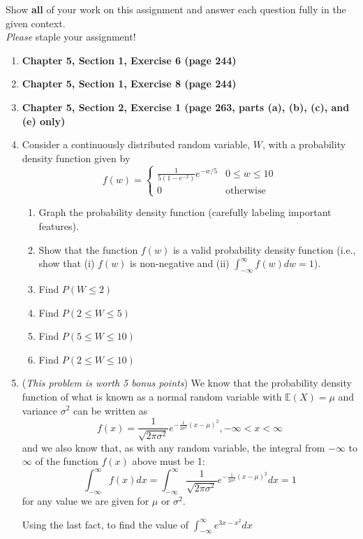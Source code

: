 \documentclass[11pt]{article}
\newcommand{\ben}{\begin{enumerate}}
\newcommand{\een}{\end{enumerate}}
\begin{document}
\pagestyle{fancy} 

Show \textbf{all} of your work on this assignment and answer each question fully in the given context. \\

\emph{Please} staple your assignment! \\

\ben

\item \textbf{Chapter 5, Section 1, Exercise 6 (page 244)}

\item \textbf{Chapter 5, Section 1, Exercise 8 (page 244)}

\item \textbf{Chapter 5, Section 2, Exercise 1 (page 263, parts (a), (b), (c), and (e) only)}

\item Consider a continuously distributed random variable, $W$, with a probability density function given by
   $$
   f(w) = \begin{cases}
      \frac{1}{5(1 - e^{-2})} e^{-w/5} & 0 \le w \le 10 \\

      0 & \text{otherwise}
   \end{cases}
   $$
   \begin{enumerate}

      \item Graph the probability density function (carefully labeling important features).

      \item Show that the function $f(w)$ is a valid probability density function (i.e., show that (i) $f(w)$ is non-negative and (ii) $\int_{-\infty}^{\infty} f(w) dw = 1$).
         
      \item Find $P(W \le 2)$
         
      \item Find $P(2 \le W \le 5)$

      \item Find $P(5 \le W \le 10)$

      \item Find $P(2 \le W \le 10)$
      
   \end{enumerate}


 \item (\textit{This problem is worth 5 bonus points})
    We know that the probability density function of what is known as a normal random variable with $\mathbb{E}(X) = \mu$ and variance $\sigma^2$ can be written as
    $$
    f(x) = \frac{1}{\sqrt{2 \pi \sigma^2}} e^{-\frac{1}{2 \sigma^2 } (x - \mu)^2}, -\infty < x < \infty
    $$
    and we also know that, as with any random variable, the integral from $-\infty$ to $\infty$ of the function $f(x)$ above must be 1:
    $$
    \int_{-\infty}^{\infty} f(x) dx  = \int_{-\infty}^{\infty} \frac{1}{\sqrt{2 \pi \sigma^2}} e^{-\frac{1}{2 \sigma^2 } (x - \mu)^2} dx  = 1
    $$
    for any value we are given for $\mu$ or $\sigma^2$.

    Using the last fact, to find the value of $ \int_{-\infty}^{\infty} e^{3x -x^2} dx $
\een
\end{document}
